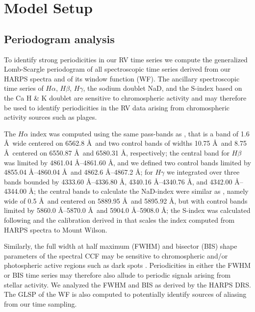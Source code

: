 \documentclass[longauth]{aa}
\begin{document}


\section{Model Setup}
\label{sec:model}

\subsection{Periodogram analysis}
\label{subsec:kep}
To identify strong periodicities in our RV time series we compute the generalized Lomb-Scargle periodogram \citep[GLSP;][]{zechmeister09} of all spectroscopic time series derived from our HARPS spectra and of its window function (WF). The ancillary spectroscopic time series of $H\alpha$, $H\beta$, $H\gamma$, the sodium doublet NaD, and the S-index based on the Ca H \& K doublet are sensitive to chromospheric activity and may therefore be used to identify periodicities in the RV data arising from chromospheric activity sources such as plages.

The $H\alpha$ index was computed using the same pass-bands as \cite{gomesdasilva12}, that is a band of 1.6 \AA\ wide centered on 6562.8 \AA\ and two control bands of widths 10.75 \AA\ and 8.75 \AA\
centered on 6550.87 \AA\ and 6580.31 \AA, respectively; the central 
band for $H\beta$ was limited by 4861.04 \AA--4861.60 \AA, and we defined two control bands limited by
4855.04 \AA--4860.04 \AA\ and 4862.6 \AA--4867.2 \AA; for $H\gamma$ we integrated over three bands
bounded by 4333.60 \AA--4336.80 \AA, 4340.16 \AA--4340.76 \AA, and 4342.00 \AA--4344.00 \AA; 
the central bands to calculate the NaD-index were similar as 
\citet{gomesdasilva12}, namely wide of 0.5 \AA\ and centered on 5889.95 \AA\ and 5895.92 \AA, 
but with control bands limited by 5860.0 \AA--5870.0 \AA\ and 5904.0 \AA--5908.0 \AA; 
the S-index was calculated following \cite{duncan1991} and the calibration derived in
\citet[][Eq.~3]{astudillodefru17b} that scales the index computed from HARPS spectra to Mount Wilson.

Similarly, the full width at half maximum (FWHM) and bisector (BIS) shape parameters of the spectral CCF may be
sensitive to chromospheric and/or photospheric active regions such as dark spots \citep{queloz01,desort07}.
Periodicities in either the FWHM or BIS time series may therefore also allude to periodic signals arising from
stellar activity. We analyzed the FWHM and BIS as derived by the HARPS DRS. The GLSP of the WF is also computed
to potentially identify sources of aliasing from our time sampling.
\end{document}
